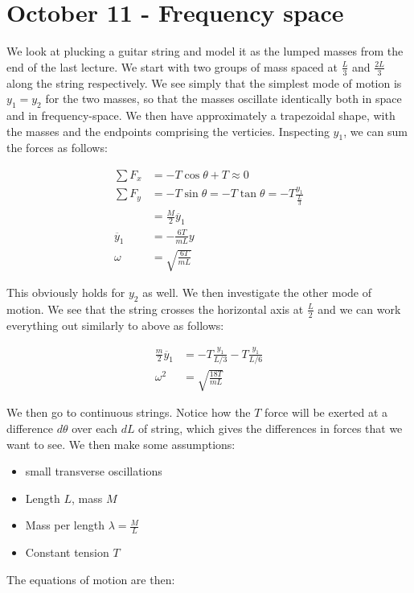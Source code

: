 \documentclass{report}
\begin{document}
\chapter{October 11 - Frequency space}

We look at plucking a guitar string and model it as the lumped masses from the end of the last lecture. We start with two groups of mass spaced at $\frac{L}{3}$ and $\frac{2L}{3}$ along the string respectively. We see simply that the simplest mode of motion is $y_1 = y_2$ for the two masses, so that the masses oscillate identically both in space and in frequency-space. We then have approximately a trapezoidal shape, with the masses and the endpoints comprising the verticies. Inspecting $y_1$, we can sum the forces as follows:

\begin{align*}
\sum{F_x} &= -T\cos\theta + T \approx 0\\
\sum{F_y} &= -T\sin\theta = -T\tan\theta = -T\frac{y_1}{\frac{L}{3}}\\
&= \frac{M}{2}\ddot{y_1}\\
\ddot{y_1} &= -\frac{6T}{mL}y\\
\omega &= \sqrt{\frac{6T}{mL}}
\end{align*}

This obviously holds for $y_2$ as well. We then investigate the other mode of motion. We see that the string crosses the horizontal axis at $\frac{L}{2}$ and we can work everything out similarly to above as follows:

\begin{align*}
\frac{m}{2}\ddot{y_1} &= -T\frac{y_1}{L/3} - T \frac{y_1}{L/6}\\
\omega^2 &= \sqrt{\frac{18T}{mL}}
\end{align*}

We then go to continuous strings. Notice how the $T$ force will be exerted at a difference $d\theta$ over each $dL$ of string, which gives the differences in forces that we want to see. We then make some assumptions:

\begin{itemize}
\item small transverse oscillations
\item Length $L$, mass $M$
\item Mass per length $\lambda = \frac{M}{L}$
\item Constant tension $T$
\end{itemize}

The equations of motion are then:
\end{document}
